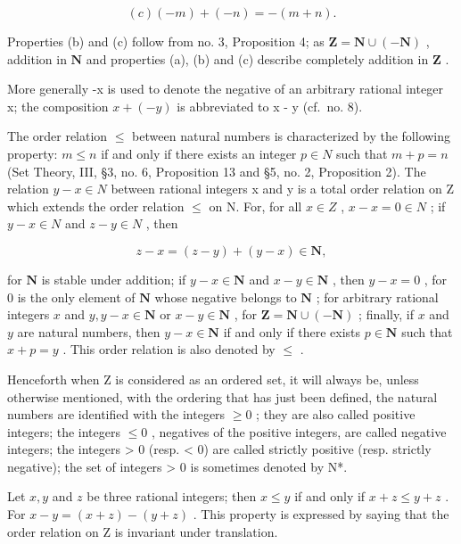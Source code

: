 \[
(c) (- m) + (- n) = - (m + n).
\]

Properties (b) and (c) follow from no. 3, Proposition 4; as \(\mathbf{Z} = \mathbf{N} \cup (-\mathbf{N})\) , addition in \(\mathbf{N}\) and properties (a), (b) and (c) describe completely addition in \(\mathbf{Z}\) .

More generally -x is used to denote the negative of an arbitrary rational integer x; the composition \(x + (-y)\) is abbreviated to x - y (cf.~no. 8).

The order relation \(\leqslant\) between natural numbers is characterized by the following property: \(m \leqslant n\) if and only if there exists an integer \(p \in N\) such that \(m + p = n\) (Set Theory, III, §3, no. 6, Proposition 13 and §5, no. 2, Proposition 2). The relation \(y - x \in N\) between rational integers x and y is a total order relation on Z which extends the order relation \(\leqslant\) on N. For, for all \(x \in Z\) , \(x - x = 0 \in N\) ; if \(y - x \in N\) and \(z - y \in N\) , then

\[
z - x = (z - y) + (y - x) \in \mathbf {N},
\]

for \(\mathbf{N}\) is stable under addition; if \(y - x \in \mathbf{N}\) and \(x - y \in \mathbf{N}\) , then \(y - x = 0\) , for \(0\) is the only element of \(\mathbf{N}\) whose negative belongs to \(\mathbf{N}\) ; for arbitrary rational integers \(x\) and \(y, y - x \in \mathbf{N}\) or \(x - y \in \mathbf{N}\) , for \(\mathbf{Z} = \mathbf{N} \cup (-\mathbf{N})\) ; finally, if \(x\) and \(y\) are natural numbers, then \(y - x \in \mathbf{N}\) if and only if there exists \(p \in \mathbf{N}\) such that \(x + p = y\) . This order relation is also denoted by \(\leqslant\) .

Henceforth when Z is considered as an ordered set, it will always be, unless otherwise mentioned, with the ordering that has just been defined, the natural numbers are identified with the integers \(\geqslant 0\) ; they are also called positive integers; the integers \(\leqslant 0\) , negatives of the positive integers, are called negative integers; the integers \textgreater{} 0 (resp. \textless{} 0) are called strictly positive (resp. strictly negative); the set of integers \textgreater{} 0 is sometimes denoted by N*.

Let \(x, y\) and \(z\) be three rational integers; then \(x \leqslant y\) if and only if \(x + z \leqslant y + z\) . For \(x - y = (x + z) - (y + z)\) . This property is expressed by saying that the order relation on Z is invariant under translation.

